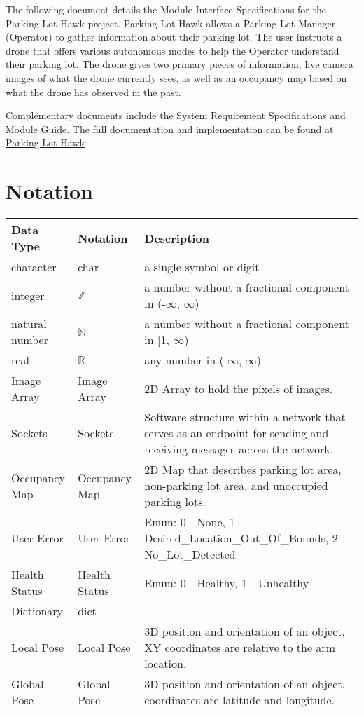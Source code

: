 \documentclass[12pt, titlepage]{article}
\begin{document}
The following document details the Module Interface Specifications for
the Parking Lot Hawk project. Parking Lot Hawk allows a Parking Lot Manager (Operator) to gather information about their parking lot. The user instructs a drone that offers various autonomous modes to help the Operator understand their parking lot. The drone gives two primary pieces of information, live camera images of what the drone currently sees, as well as an occupancy map based on what the drone has observed in the past.

Complementary documents include the System Requirement Specifications
and Module Guide.  The full documentation and implementation can be
found at \href{https://github.com/icecap360/DroneCapstone}{Parking Lot Hawk}

\section{Notation}



\begin{center}
\renewcommand{\arraystretch}{1.2}
\noindent 
\begin{tabular}{p{2cm} p{2cm} p{10cm}}
\toprule 
\textbf{Data Type} & \textbf{Notation} & \textbf{Description}\\ 
\midrule
character & char & a single symbol or digit\\
integer & $\mathbb{Z}$ & a number without a fractional component in (-$\infty$, $\infty$) \\
natural number & $\mathbb{N}$ & a number without a fractional component in [1, $\infty$) \\
real & $\mathbb{R}$ & any number in (-$\infty$, $\infty$)\\
Image Array & Image Array & 2D Array to hold the pixels of images.\\
Sockets & Sockets & Software structure within a network that serves as an endpoint for sending and receiving messages across the network.\\
Occupancy Map & Occupancy Map & 2D Map that describes parking lot area, non-parking lot area, and unoccupied parking lots.\\
User Error & User Error & Enum: 0 - None, 1 - Desired_Location_Out_Of_Bounds, 2  - No_Lot_Detected \\
Health Status & Health Status & Enum: 0 - Healthy, 1 - Unhealthy \\
Dictionary & dict & - \\
Local Pose & Local Pose & 3D position and orientation of an object, XY coordinates are relative to the arm location. \\
Global Pose & Global Pose & 3D position and orientation of an object, coordinates are latitude and longitude. \\
\midrule
\end{tabular} 
\end{center}
\end{document}
